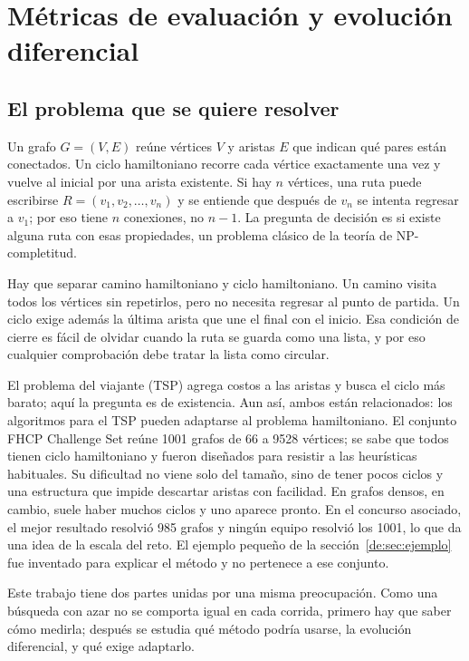 \chapter{Métricas de evaluación y evolución diferencial}
\section{El problema que se quiere resolver}
Un grafo $G=(V,E)$ reúne vértices $V$ y aristas $E$ que indican qué pares están conectados. Un ciclo hamiltoniano recorre cada vértice exactamente una vez y vuelve al inicial por una arista existente. Si hay $n$ vértices, una ruta puede escribirse $R=(v_1,v_2,\ldots,v_n)$ y se entiende que después de $v_n$ se intenta regresar a $v_1$; por eso tiene $n$ conexiones, no $n-1$. La pregunta de decisión es si existe alguna ruta con esas propiedades, un problema clásico de la teoría de NP-completitud.\cite{de1}

Hay que separar camino hamiltoniano y ciclo hamiltoniano. Un camino visita todos los vértices sin repetirlos, pero no necesita regresar al punto de partida. Un ciclo exige además la última arista que une el final con el inicio. Esa condición de cierre es fácil de olvidar cuando la ruta se guarda como una lista, y por eso cualquier comprobación debe tratar la lista como circular.

El problema del viajante (TSP) agrega costos a las aristas y busca el ciclo más barato; aquí la pregunta es de existencia. Aun así, ambos están relacionados: los algoritmos para el TSP pueden adaptarse al problema hamiltoniano.\cite{de2} El conjunto FHCP Challenge Set reúne 1001 grafos de 66 a 9528 vértices; se sabe que todos tienen ciclo hamiltoniano y fueron diseñados para resistir a las heurísticas habituales.\cite{de2,de3} Su dificultad no viene solo del tamaño, sino de tener pocos ciclos y una estructura que impide descartar aristas con facilidad.\cite{de2} En grafos densos, en cambio, suele haber muchos ciclos y uno aparece pronto.\cite{de4} En el concurso asociado, el mejor resultado resolvió 985 grafos y ningún equipo resolvió los 1001,\cite{de3} lo que da una idea de la escala del reto. El ejemplo pequeño de la sección~\ref{de:sec:ejemplo} fue inventado para explicar el método y no pertenece a ese conjunto.

Este trabajo tiene dos partes unidas por una misma preocupación. Como una búsqueda con azar no se comporta igual en cada corrida, primero hay que saber cómo medirla; después se estudia qué método podría usarse, la evolución diferencial, y qué exige adaptarlo.


